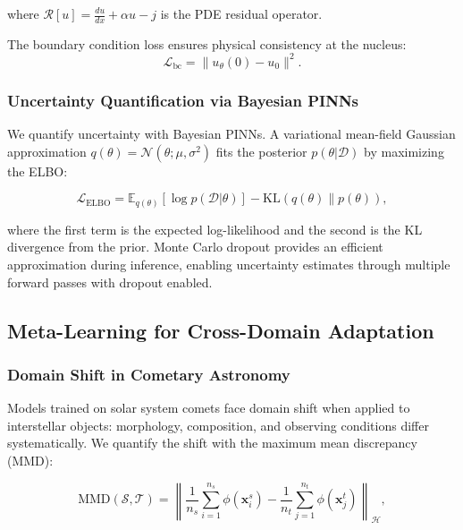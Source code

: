 \documentclass[preprint2]{aastex631}
\begin{document}
where $\mathcal{R}[u] = \frac{du}{dx} + \alpha u - j$ is the PDE residual operator.

The boundary condition loss ensures physical consistency at the nucleus:
\begin{equation}\label{eq:bc_loss}
\mathcal{L}_{\text{bc}} = \|u_\theta(0) - u_0\|^2.
\end{equation}

\subsubsection{Uncertainty Quantification via Bayesian PINNs}

We quantify uncertainty with Bayesian PINNs. A variational mean-field Gaussian approximation $q(\theta) = \mathcal{N}(\theta; \mu, \sigma^2)$ fits the posterior $p(\theta | \mathcal{D})$ by maximizing the ELBO:

\begin{equation}\label{eq:elbo}
\mathcal{L}_{\text{ELBO}} = \mathbb{E}_{q(\theta)}[\log p(\mathcal{D}|\theta)] - \text{KL}(q(\theta) \| p(\theta)),
\end{equation}

where the first term is the expected log-likelihood and the second is the KL divergence from the prior. Monte Carlo dropout \citep{gal16} provides an efficient approximation during inference, enabling uncertainty estimates through multiple forward passes with dropout enabled.

\subsection{Meta-Learning for Cross-Domain Adaptation}

\subsubsection{Domain Shift in Cometary Astronomy}

Models trained on solar system comets face domain shift when applied to interstellar objects: morphology, composition, and observing conditions differ systematically. We quantify the shift with the maximum mean discrepancy (MMD):

\begin{equation}\label{eq:mmd}
\text{MMD}(\mathcal{S}, \mathcal{T}) = \left\| \frac{1}{n_s} \sum_{i=1}^{n_s} \phi(\mathbf{x}_i^s) - \frac{1}{n_t} \sum_{j=1}^{n_t} \phi(\mathbf{x}_j^t) \right\|_{\mathcal{H}},
\end{equation}
\end{document}
